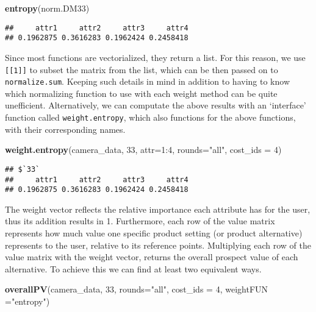 \documentclass[]{article}
\newenvironment{Shaded}{\begin{snugshade}}{\end{snugshade}}
\newcommand{\KeywordTok}[1]{\textcolor[rgb]{0.13,0.29,0.53}{\textbf{{#1}}}}
\newcommand{\DataTypeTok}[1]{\textcolor[rgb]{0.13,0.29,0.53}{{#1}}}
\newcommand{\DecValTok}[1]{\textcolor[rgb]{0.00,0.00,0.81}{{#1}}}
\newcommand{\StringTok}[1]{\textcolor[rgb]{0.31,0.60,0.02}{{#1}}}
\newcommand{\NormalTok}[1]{{#1}}
\begin{document}
\begin{Shaded}
\begin{Highlighting}[]
\KeywordTok{entropy}\NormalTok{(norm.DM33)}
\end{Highlighting}
\end{Shaded}

\begin{verbatim}
##     attr1     attr2     attr3     attr4 
## 0.1962875 0.3616283 0.1962424 0.2458418
\end{verbatim}

Since most functions are vectorialized, they return a list. For this
reason, we use \texttt{[[1]]} to subset the matrix from the list, which
can be then passed on to \texttt{normalize.sum}. Keeping such details in
mind in addition to having to know which normalizing function to use
with each weight method can be quite unefficient. Alternatively, we can
computate the above results with an `interface' function called
\texttt{weight.entropy}, which also functions for the above functions,
with their corresponding names.

\begin{Shaded}
\begin{Highlighting}[]
\KeywordTok{weight.entropy}\NormalTok{(camera_data, }\DecValTok{33}\NormalTok{, }\DataTypeTok{attr=}\DecValTok{1}\NormalTok{:}\DecValTok{4}\NormalTok{, }\DataTypeTok{rounds=}\StringTok{"all"}\NormalTok{, }\DataTypeTok{cost_ids =} \DecValTok{4}\NormalTok{)}
\end{Highlighting}
\end{Shaded}

\begin{verbatim}
## $`33`
##     attr1     attr2     attr3     attr4 
## 0.1962875 0.3616283 0.1962424 0.2458418
\end{verbatim}

The weight vector reflects the relative importance each attribute has
for the user, thus its addition results in 1. Furthermore, each row of
the value matrix represents how much value one specific product setting
(or product alternative) represents to the user, relative to its
reference points. Multiplying each row of the value matrix with the
weight vector, returns the overall prospect value of each alternative.
To achieve this we can find at least two equivalent ways.

\begin{Shaded}
\begin{Highlighting}[]
\KeywordTok{overallPV}\NormalTok{(camera_data, }\DecValTok{33}\NormalTok{, }\DataTypeTok{rounds=}\StringTok{"all"}\NormalTok{, }\DataTypeTok{cost_ids =} \DecValTok{4}\NormalTok{, }\DataTypeTok{weightFUN =}\StringTok{"entropy"}\NormalTok{)}
\end{Highlighting}
\end{Shaded}
\end{document}
